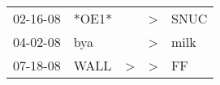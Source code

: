 \begin{supertabular}{p{0.07\textwidth}p{0.06\textwidth}p{0.02\textwidth}p{0.02\textwidth}p{0.06\textwidth}}
 02-16-08\textsuperscript{} &                   *OE1* &               &  \textgreater &  SNUC\textsuperscript{} \\
 04-02-08\textsuperscript{} &   bya\textsuperscript{} &               &  \textgreater &  milk\textsuperscript{} \\
 07-18-08\textsuperscript{} &  WALL\textsuperscript{} &  \textgreater &  \textgreater &    FF\textsuperscript{} \\
\end{supertabular}
